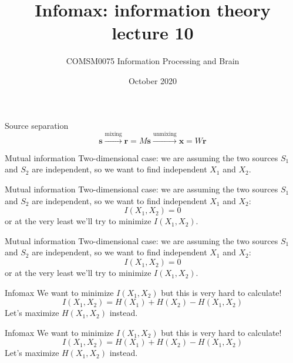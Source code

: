 \documentclass{beamer}
\title[Information Theory lecture 10]{Infomax: information theory lecture 10}
\author{COMSM0075 Information Processing and Brain}
\institute{\texttt{comsm0075.github.io}}
\date{October 2020}
\newcommand{\crish}{\color{reddish}}
\newcommand{\cbla}{\color{black}}
\newcommand{\cred}{\color{red}}
\newcommand{\cblu}{\color{blue}}
\begin{document}
\maketitle

\begin{frame}{Source separation}
  \cred
  $$
 \mathbf{ s}\stackrel{\mbox{mixing}}{\longrightarrow}\mathbf{r}=M\mathbf{ s}\stackrel{\mbox{unmixing}}{\longrightarrow}\mathbf{ x}=W\mathbf{r}
 $$
 \cbla
\end{frame}

\begin{frame}{Mutual information}
  Two-dimensional case: we are assuming the two sources \crish$S_1$\cbla{} and \crish$S_2$\cbla{} are independent, so we want to find independent \crish$X_1$\cbla{} and \crish$X_2$\cbla.
\end{frame}

\begin{frame}{Mutual information}
  Two-dimensional case: we are assuming the two sources \crish$S_1$\cbla{} and \crish$S_2$\cbla{} are independent, so we want to find independent \crish$X_1$\cbla{} and \crish$X_2$\cbla:
  \crish
  $$
  I(X_1,X_2)=0
  $$
  \cbla
  or at the very least we'll try to minimize \cblu$I(X_1,X_2)$\cbla{}.
\end{frame}


\begin{frame}{Mutual information}
  Two-dimensional case: we are assuming the two sources \crish$S_1$\cbla{} and \crish$S_2$\cbla{} are independent, so we want to find independent \crish$X_1$\cbla{} and \crish$X_2$\cbla:
  \crish
  $$
  I(X_1,X_2)=0
  $$
  \cbla
  or at the very least we'll try to minimize \cblu$I(X_1,X_2)$\cbla{}.
\end{frame}


\begin{frame}{Infomax}
  We want to minimize \cblu$I(X_1,X_2)$\cbla{} but this is very hard to calculate!
  \crish
  $$
  I(X_1,X_2)=H(X_1)+H(X_2)-H(X_1,X_2)
  $$
  \cbla
  Let's maximize \crish$H(X_1,X_2)$\cbla{} instead.
  
\end{frame}


\begin{frame}{Infomax}
  We want to minimize $I(X_1,X_2)$\cbla{} but this is very hard to calculate!
  \crish
  $$
  I(X_1,X_2)=H(X_1)+H(X_2)-H(X_1,X_2)
  $$
  \cbla
  Let's \cblu{}maximize $H(X_1,X_2)$\cbla{} instead.
  \end{frame}
\end{document}
